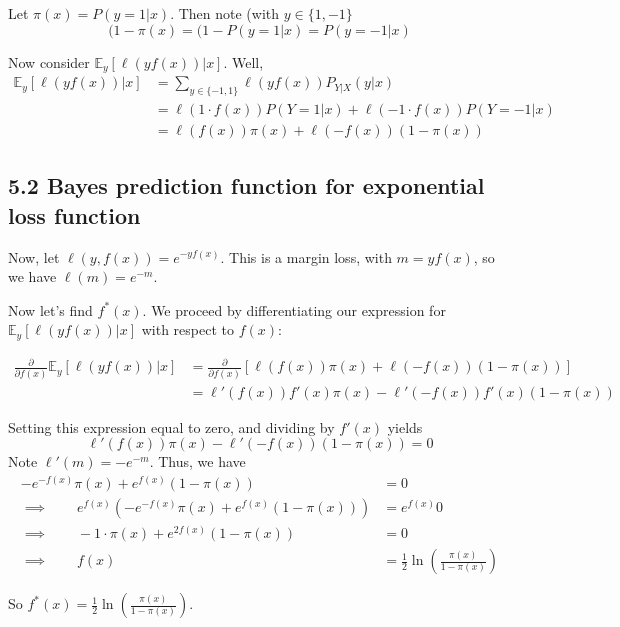 \documentclass[paper=a4, fontsize=11pt]{scrartcl} %
\numberwithin{equation}{section} %
\numberwithin{figure}{section} %
\numberwithin{table}{section} %
\begin{document}
Let $\pi(x) = P(y = 1 | x)$. Then note (with $y \in \{1, -1\}$
\[(1- \pi(x) = (1 - P(y = 1 | x) = P(y = -1 | x)\]

Now consider $\mathbb{E}_y[\ell(yf(x)) | x]$. Well,
\begin{align*}
\mathbb{E}_y[\ell(yf(x)) | x]  &= \sum_{y \in \{-1, 1\}} \ell(yf(x))P_{Y | X} (y | x) \\
	&= \ell(1\cdot f(x))P(Y = 1 | x) + \ell(-1 \cdot f(x)) P(Y = -1 | x) \\
	&= \ell(f(x))\pi(x) + \ell(-f(x)) (1- \pi(x))	
\end{align*}

\subsection*{5.2 Bayes prediction function for exponential loss function}

Now, let $\ell(y, f(x)) = e^{-y f(x)}$. This is a margin loss, with $m = yf(x)$, so we have $\ell(m) = e^{-m}$.

Now let's find $f^*(x)$. We proceed by differentiating our expression for $\mathbb{E}_y[\ell(yf(x)) | x]$ with respect to $f(x)$:

\begin{align*}
\frac{\partial}{\partial f(x)} \mathbb{E}_y[\ell(yf(x)) | x]  &= \frac{\partial}{\partial f(x)} \left[\ell(f(x))\pi(x) + \ell(-f(x)) (1- \pi(x))	\right] \\
	&= \ell'(f(x))f'(x)\pi(x) - \ell'(-f(x))f'(x)(1- \pi(x))
\end{align*}

Setting this expression equal to zero, and dividing by $f'(x)$ yields
\[\ell'(f(x))\pi(x) - \ell'(-f(x))(1- \pi(x)) = 0 \]
Note $\ell'(m) = - e^{-m}$. Thus, we have
\begin{align*}
-e^{-f(x)} \pi(x) + e^{f(x)}(1 - \pi(x)) &= 0 \\
\implies \qquad{} e^{f(x)}\left(- e^{-f(x)} \pi(x) + e^{f(x)}(1 - \pi(x))\right) &= e^{f(x)} 0 \\
\implies \qquad{} -1 \cdot \pi(x) + e^{2f(x)}(1 - \pi(x)) &= 0 \\
\implies \qquad{} f(x) &= \frac{1}{2} \ln \left(\frac{\pi(x)}{1 - \pi(x)}\right)
\end{align*}

So $f^*(x) = \frac{1}{2} \ln \left(\frac{\pi(x)}{1 - \pi(x)}\right)$.\\
\end{document}
